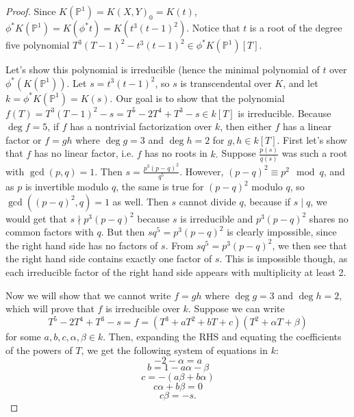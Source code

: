 \documentclass{article}
\theoremstyle{customplain}
\theoremstyle{customdef}
\renewcommand{\P}{\mathbb{P}}
\theoremstyle{definition} %
\begin{document}
\begin{proof}
Since $K(\P^1)=K(X,Y)_0=K(t)$, $\phi^* K(\P^1) = K(\phi^*t) = K(t^3(t-1)^2).$ Notice that $t$ is a root of the degree five polynomial $T^3(T-1)^2-t^3(t-1)^2\in \phi^*K(\P^1)[T]$.

Let's show this polynomial is irreducible (hence the minimal polynomial of $t$ over $\phi^*(K(\P^1))$. Let $s=t^3(t-1)^2$, so $s$ is transcendental over $K$, and let $k = \phi^* K(\P^1)=K(s)$. Our goal is to show that the polynomial $f(T)=T^3(T-1)^2-s=T^5-2T^4+T^3-s\in k[T]$ is irreducible. Because $\deg f = 5$, if $f$ has a nontrivial factorization over $k$, then either $f$ has a linear factor or $f=gh$ where $\deg g = 3$ and $\deg h = 2$ for $g,h\in k[T].$ First let's show that $f$ has no linear factor, i.e. $f$ has no roots in $k.$ Suppose $\frac{p(s)}{q(s)}$ was such a root with $\gcd(p, q)=1$. Then $s=\frac{p^3(p-q)^2}{q^5}$. However, $(p-q)^2 \equiv p^2 \mod q$, and as $p$ is invertible modulo $q$, the same is true for $(p-q)^2$ modulo $q$, so $\gcd((p-q)^2, q)=1$ as well. Then $s$ cannot divide $q$, because if $s\mid q$, we would get that $s\nmid p^3(p-q)^2$ because $s$ is irreducible and $p^3(p-q)^2$ shares no common factors with $q$. But then $sq^5 = p^3(p-q)^2$ is clearly impossible, since the right hand side has no factors of $s$. From $sq^5 = p^3(p-q)^2$, we then see that the right hand side contains exactly one factor of $s$. This is impossible though, as each irreducible factor of the right hand side appears with multiplicity at least 2.

Now we will show that we cannot write $f=gh$ where $\deg g = 3$ and $\deg h = 2$, which will prove that $f$ is irreducible over $k.$ Suppose we can write 
\[
T^5-2T^4+T^3-s = f = \left( T^3+aT^2+bT+c\right) \left( T^2+\alpha T + \beta \right)
\]
for some $a,b,c,\alpha, \beta \in k.$ Then, expanding the RHS and equating the coefficients of the powers of $T$, we get the following system of equations in $k$: 
\begin{equation}
    -2-\alpha=a\tag{1}
\end{equation}
\begin{equation}
    b=1-a\alpha-\beta \tag{2}
\end{equation}
\begin{equation}
    c=-(a\beta+b\alpha)\tag{3}
\end{equation}
\begin{equation}
    c\alpha+b\beta = 0 \tag{4}
\end{equation}
\begin{equation}
    c\beta = -s. \tag{5}
\end{equation}


\end{proof}
\end{document}
